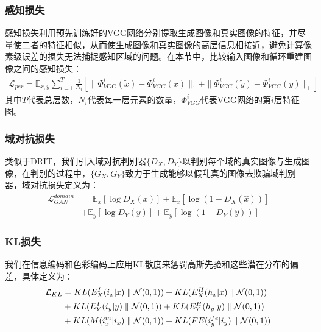 \subsubsection{感知损失}

感知损失利用预先训练好的VGG网络分别提取生成图像和真实图像的特征，并尽量使二者的特征相似，从而使生成图像和真实图像的高层信息相接近，避免计算像素级误差的损失无法捕捉感知区域的问题。在本节中，比较输入图像和循环重建图像之间的感知损失：
\begin{equation}
\begin{split}
\mathcal{L}_{per}=\mathbb{E}_{x,y}\sum_{i=1}^T\frac{1}{N_i}[\parallel\Phi_{VGG}^i(\tilde{x})-\Phi_{VGG}^i(x)\parallel_1 + \parallel\Phi_{VGG}^i(\tilde{y})-\Phi_{VGG}^i(y)\parallel_1]
\end{split}
\label{eq:perceptual}
\end{equation}
其中$T$代表总层数，$N_i$代表每一层元素的数量，$\Phi_{VGG}^i$代表VGG网络的第$i$层特征图。

\subsubsection{域对抗损失}

类似于DRIT\cite{lee2018diverse}，我们引入域对抗判别器$\{D_X, D_Y\}$以判别每个域的真实图像与生成图像，在判别的过程中，$\{G_X, G_Y\}$致力于生成能够以假乱真的图像去欺骗域判别器，域对抗损失定义为：
\begin{equation}
\begin{split}
\mathcal{L}_{GAN}^{domain}& = \mathbb{E}_x[\log D_X(x)] + \mathbb{E}_x[\log(1-D_X(\hat{x}))] \\
& + \mathbb{E}_y[\log D_Y(y)] + \mathbb{E}_y[\log(1-D_Y(\hat{y}))]
\end{split}
\label{eq:GAN_loss}
\end{equation}

\subsubsection{KL损失}

我们在信息编码和色彩编码上应用KL散度来惩罚高斯先验和这些潜在分布的偏差，具体定义为：
\begin{equation}
\begin{split}
\mathcal{L}_{KL}& = \mathnormal{KL}(E_X^I(i_x|x)\parallel \mathcal{N}(0,1)) + \mathnormal{KL}(E_X^H(h_x|x)\parallel \mathcal{N}(0,1)) \\
 & + \mathnormal{KL}(E_Y^I(i_y|y)\parallel \mathcal{N}(0,1)) + \mathnormal{KL}(E_Y^H(h_y|y)\parallel \mathcal{N}(0,1)) \\
 & + \mathnormal{KL}(M(i_x^m|i_x)\parallel \mathcal{N}(0,1)) + \mathnormal{KL}(FE(i_y^{fe}|i_y)\parallel \mathcal{N}(0,1))
\end{split}
\label{eq:KL}
\end{equation}

